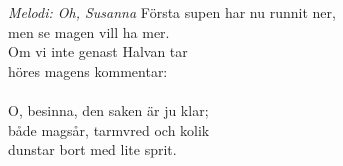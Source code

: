 {\footnotesize\textit{Melodi: Oh, Susanna}}
\vspace{10pt}
Första supen har nu runnit ner,\\
men se magen vill ha mer.\\
Om vi inte genast Halvan tar\\
höres magens kommentar:\\
\\
O, besinna, den saken är ju klar;\\
både magsår, tarmvred och kolik\\
dunstar bort med lite sprit.
